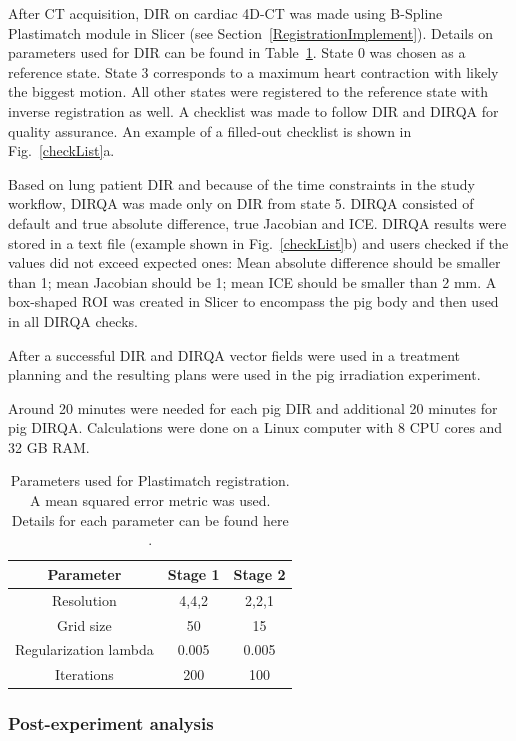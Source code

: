After CT acquisition, DIR on cardiac 4D-CT was made using B-Spline Plastimatch module in Slicer (see Section~\ref{RegistrationImplement}). 
Details on parameters used for DIR can be found in Table~\ref{tab:stages2}. State 0 was chosen as a reference state. State 3 corresponds to a maximum heart contraction with likely
the biggest motion. All other states were registered to the reference state with inverse registration as well. 
A checklist was made to follow DIR and DIRQA for quality assurance. An example of a filled-out checklist is shown in Fig.~\ref{checkList}a.

Based on lung patient DIR and because of the time constraints in the study workflow, DIRQA was made only on DIR from state 5. 
DIRQA consisted of default and true absolute difference, true Jacobian and ICE. DIRQA results were stored in a text file (example shown in Fig.~\ref{checkList}b) and users checked if the values did not exceed expected ones: Mean absolute difference
should be smaller than 1; mean Jacobian  should be 1; mean ICE  should be smaller than 2 mm. A box-shaped ROI was created in Slicer to encompass the pig body and then used in all DIRQA checks.

After a successful DIR and DIRQA vector fields were used in a treatment planning and the resulting plans were used in the pig irradiation experiment.

Around 20 minutes were needed for each pig DIR and additional 20 minutes for pig DIRQA. Calculations were done on a Linux computer with 8 CPU cores and 32 GB RAM.

\begin{table}[H]
  \centering
  \caption{Parameters used for Plastimatch registration.  A mean squared error metric was used. Details for each parameter can be found here \cite{Plastimatch}.}
  \begin{tabular}{c|c|c}
      Parameter & Stage 1 & Stage 2 \\
      \hline
      Resolution & 4,4,2 & 2,2,1 \\
      Grid size & 50 & 15 \\
      Regularization lambda & 0.005 & 0.005 \\
      Iterations & 200 & 100 \\
    \hline\hline
  \end{tabular}
  \label{tab:stages2}
\end{table}

\subsubsection{Post-experiment analysis}

